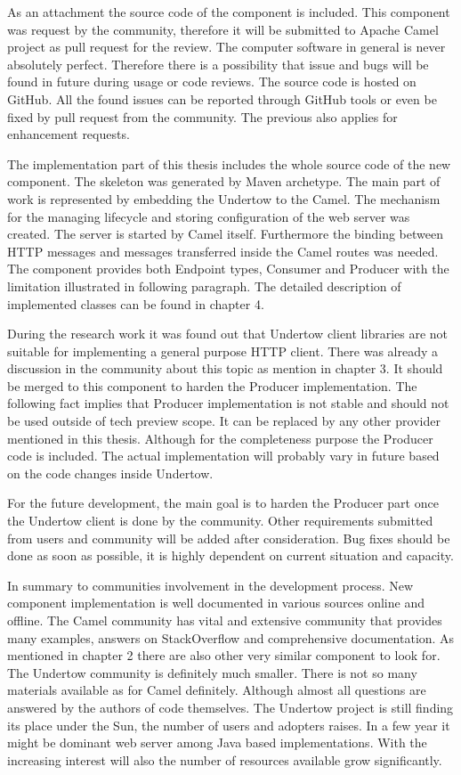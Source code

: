 \documentclass[12pt,final,oneside]{fithesis2}
\begin{document}
As an attachment the source code of the component is included. This component was request by the community, therefore it will be submitted to Apache Camel project as pull request for the review. The computer software in general is never absolutely perfect. Therefore there is a possibility that issue and bugs will be found in future during usage or code reviews. The source code is hosted on GitHub. All the found issues can be reported through GitHub tools or even be fixed by pull request from the community. The previous also applies for enhancement requests.

The implementation part of this thesis includes the whole source code of the new component. The skeleton was generated by Maven archetype. The main part of work is represented by embedding the Undertow to the Camel. The mechanism for the managing lifecycle and storing configuration of the web server was created. The server is started by Camel itself. Furthermore the binding between HTTP messages and messages transferred inside the Camel routes was needed. The component provides both Endpoint types, Consumer and Producer with the limitation illustrated in following paragraph. The detailed description of implemented classes can be found in chapter 4.

During the research work it was found out that Undertow client libraries are not suitable for implementing a general purpose HTTP client.
There was already a discussion in the community about this topic as mention in chapter 3. It should be merged to this component to harden the Producer implementation. The following fact implies that Producer implementation is not stable and should not be used outside of tech preview scope. It can be replaced by any other provider mentioned in this thesis. Although for the completeness purpose the Producer code is included. The actual implementation will probably vary in future based on the code changes inside Undertow.

For the future development, the main goal is to harden the Producer part once the Undertow client is done by the community. Other requirements submitted from users and community will be added after consideration. Bug fixes should be done as soon as possible, it is highly dependent on current situation and capacity.

In summary to communities involvement in the development process. New component implementation is well documented in various sources online and offline. The Camel community has vital and extensive community that provides many examples, answers on StackOverflow and comprehensive documentation. As mentioned in chapter 2 there are also other very similar component to look for. The Undertow community is definitely much smaller. There is not so many materials available as for Camel definitely. Although almost all questions are answered by the authors of code themselves. The Undertow project is still finding its place under the Sun, the number of users and adopters raises. In a few year it might be dominant web server among Java based implementations. With the increasing interest will also the number of resources available grow significantly. 
\end{document}

